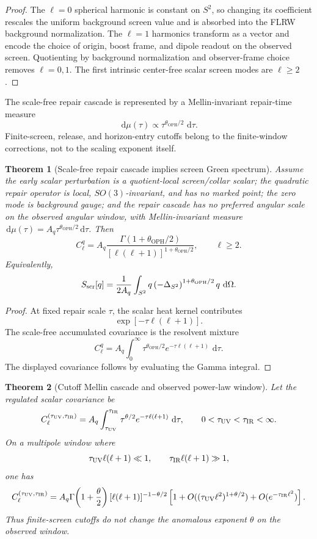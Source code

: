 \documentclass[11pt]{article}
\newtheorem{theorem}{Theorem}[section]
\newcommand{\OPH}{\mathrm{OPH}}
\newcommand{\dd}{\,\mathrm d}
\begin{document}
\begin{proof}
The \(\ell=0\) spherical harmonic is constant on \(S^2\), so changing its coefficient rescales the
uniform background screen value and is absorbed into the FLRW background normalization. The
\(\ell=1\) harmonics transform as a vector and encode the choice of origin, boost frame, and dipole
readout on the observed screen. Quotienting by background normalization and observer-frame choice
removes \(\ell=0,1\). The first intrinsic center-free scalar screen modes are
\(\ell\ge2\).
\end{proof}

The scale-free repair cascade is represented by a Mellin-invariant repair-time measure
\[
\dd\mu(\tau)\propto \tau^{\theta_{\OPH}/2}\,\dd\tau .
\]
Finite-screen, release, and horizon-entry cutoffs belong to the finite-window corrections, not to the
scaling exponent itself.

\begin{theorem}[Scale-free repair cascade implies screen Green spectrum]\label{thm:greenspectrum}
Assume the early scalar perturbation is a quotient-local screen/collar scalar; the quadratic repair
operator is local, \(SO(3)\)-invariant, and has no marked point; the zero mode is background gauge;
and the repair cascade has no preferred angular scale on the observed angular window, with
Mellin-invariant measure \(\dd\mu(\tau)=A_q\tau^{\theta_{\OPH}/2}\dd\tau\). Then
\[
C_\ell^q
=
A_q
\frac{\Gamma(1+\theta_{\OPH}/2)}
{[\ell(\ell+1)]^{1+\theta_{\OPH}/2}},
\qquad \ell\ge2.
\]
Equivalently,
\[
S_{\rm scr}[q]
=
\frac{1}{2A_q}
\int_{S^2}q\left(-\Delta_{S^2}\right)^{1+\theta_{\OPH}/2}q\,\dd\Omega .
\]
\end{theorem}

\begin{proof}
At fixed repair scale \(\tau\), the scalar heat kernel contributes
\[
\exp[-\tau\ell(\ell+1)].
\]
The scale-free accumulated covariance is the resolvent mixture
\[
C_\ell^q
=
A_q\int_0^\infty
\tau^{\theta_{\OPH}/2}e^{-\tau\ell(\ell+1)}\,\dd\tau .
\]
The displayed covariance follows by evaluating the Gamma integral.
\end{proof}

\begin{theorem}[Cutoff Mellin cascade and observed power-law window]\label{thm:cutoff-window}
Let the regulated scalar covariance be
\[
C_\ell^{(\tau_{\rm UV},\tau_{\rm IR})}
=
A_q
\int_{\tau_{\rm UV}}^{\tau_{\rm IR}}
\tau^{\theta/2}e^{-\tau\ell(\ell+1)}\,\dd\tau,
\qquad
0<\tau_{\rm UV}<\tau_{\rm IR}<\infty .
\]
On a multipole window where
\[
\tau_{\rm UV}\ell(\ell+1)\ll1,
\qquad
\tau_{\rm IR}\ell(\ell+1)\gg1,
\]
one has
\[
C_\ell^{(\tau_{\rm UV},\tau_{\rm IR})}
=
A_q\Gamma\!\left(1+\frac{\theta}{2}\right)
[\ell(\ell+1)]^{-1-\theta/2}
\left[
1
+
O((\tau_{\rm UV}\ell^2)^{1+\theta/2})
+
O(e^{-\tau_{\rm IR}\ell^2})
\right].
\]
Thus finite-screen cutoffs do not change the anomalous exponent \(\theta\) on the observed window.
\end{theorem}
\end{document}
